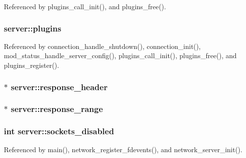 Referenced by plugins\-\_\-call\-\_\-init(), and plugins\-\_\-free().

\hypertarget{structserver_af22577eb49dc399ae96da71a574b131e}{
\subsubsection[{plugins}]{ server\-::plugins}}\label{structserver_af22577eb49dc399ae96da71a574b131e}


Referenced by connection\-\_\-handle\-\_\-shutdown(), connection\-\_\-init(), mod\-\_\-status\-\_\-handle\-\_\-server\-\_\-config(), plugins\-\_\-call\-\_\-init(), plugins\-\_\-free(), and plugins\-\_\-register().

\hypertarget{structserver_a4127dbfb147505f2816e5871a86ae359}{
\subsubsection[{response\-\_\-header}]{$\ast$ server\-::response\-\_\-header}}\label{structserver_a4127dbfb147505f2816e5871a86ae359}
\hypertarget{structserver_a06a78263bcf7d9f0b9a00e3fc5e508f5}{
\subsubsection[{response\-\_\-range}]{$\ast$ server\-::response\-\_\-range}}\label{structserver_a06a78263bcf7d9f0b9a00e3fc5e508f5}
\hypertarget{structserver_accf5f45a3d146f55f2ac2acc5a495f27}{
\subsubsection[{sockets\-\_\-disabled}]{\setlength{\rightskip}{0pt plus 5cm}int server\-::sockets\-\_\-disabled}}\label{structserver_accf5f45a3d146f55f2ac2acc5a495f27}


Referenced by main(), network\-\_\-register\-\_\-fdevents(), and network\-\_\-server\-\_\-init().

